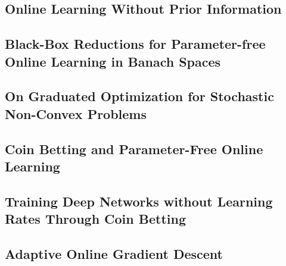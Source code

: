 \subsection{Online Learning Without Prior Information}
\label{ssec: online_learning_without_prior_info}

\clearpage

\subsection{Black-Box Reductions for Parameter-free Online Learning in Banach Spaces}

\clearpage

\subsection{On Graduated Optimization for Stochastic Non-Convex Problems}

\clearpage

\subsection{Coin Betting and Parameter-Free Online Learning}

\clearpage

\subsection{Training Deep Networks without Learning Rates Through Coin Betting}

\clearpage

\subsection{Adaptive Online Gradient Descent}

\clearpage


